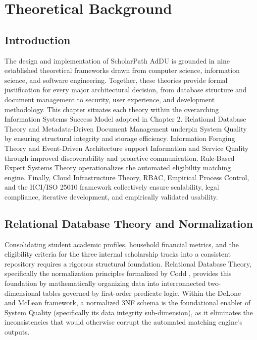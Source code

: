 \chapter{Theoretical Background}
\label{ch:theory}

\section{Introduction}

The design and implementation of ScholarPath AdDU is grounded in nine established theoretical frameworks drawn from computer science, information science, and software engineering. Together, these theories provide formal justification for every major architectural decision, from database structure and document management to security, user experience, and development methodology. This chapter situates each theory within the overarching Information Systems Success Model \cite{ref20} adopted in Chapter 2. Relational Database Theory and Metadata-Driven Document Management underpin System Quality by ensuring structural integrity and storage efficiency. Information Foraging Theory and Event-Driven Architecture support Information and Service Quality through improved discoverability and proactive communication. Rule-Based Expert Systems Theory operationalizes the automated eligibility matching engine. Finally, Cloud Infrastructure Theory, RBAC, Empirical Process Control, and the HCI/ISO 25010 framework collectively ensure scalability, legal compliance, iterative development, and empirically validated usability.

\section{Relational Database Theory and Normalization}

Consolidating student academic profiles, household financial metrics, and the eligibility criteria for the three internal scholarship tracks into a consistent repository requires a rigorous structural foundation. Relational Database Theory, specifically the normalization principles formalized by Codd \cite{ref17}, provides this foundation by mathematically organizing data into interconnected two-dimensional tables governed by first-order predicate logic. Within the DeLone and McLean \cite{ref20} framework, a normalized 3NF schema is the foundational enabler of System Quality (specifically its data integrity sub-dimension), as it eliminates the inconsistencies that would otherwise corrupt the automated matching engine's outputs.

